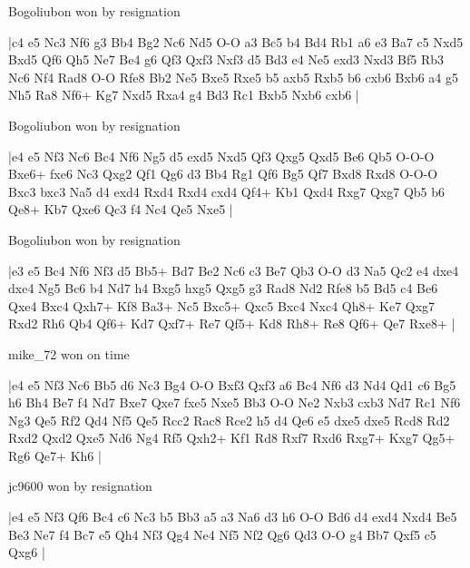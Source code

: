 \showboard

Bogoliubon won by resignation

\makegametitle
|c4 e5 Nc3 Nf6 g3 Bb4 Bg2 Nc6 Nd5 O-O a3 Bc5 b4 Bd4 Rb1 a6 e3 Ba7 c5 Nxd5 Bxd5 Qf6 Qh5 Ne7 Be4 g6 Qf3 Qxf3 Nxf3 d5 Bd3 e4 Ne5 exd3 Nxd3 Bf5 Rb3 Nc6 Nf4 Rad8 O-O Rfe8 Bb2 Ne5 Bxe5 Rxe5 b5 axb5 Rxb5 b6 cxb6 Bxb6 a4 g5 Nh5 Ra8 Nf6+ Kg7 Nxd5 Rxa4 g4 Bd3 Rc1 Bxb5 Nxb6 cxb6  |

\showboard

Bogoliubon won by resignation

\makegametitle
|e4 e5 Nf3 Nc6 Bc4 Nf6 Ng5 d5 exd5 Nxd5 Qf3 Qxg5 Qxd5 Be6 Qb5 O-O-O Bxe6+ fxe6 Nc3 Qxg2 Qf1 Qg6 d3 Bb4 Rg1 Qf6 Bg5 Qf7 Bxd8 Rxd8 O-O-O Bxc3 bxc3 Na5 d4 exd4 Rxd4 Rxd4 cxd4 Qf4+ Kb1 Qxd4 Rxg7 Qxg7 Qb5 b6 Qe8+ Kb7 Qxe6 Qc3 f4 Nc4 Qe5 Nxe5  |

\showboard

Bogoliubon won by resignation

\makegametitle
|e3 e5 Bc4 Nf6 Nf3 d5 Bb5+ Bd7 Be2 Nc6 c3 Be7 Qb3 O-O d3 Na5 Qc2 e4 dxe4 dxe4 Ng5 Bc6 b4 Nd7 h4 Bxg5 hxg5 Qxg5 g3 Rad8 Nd2 Rfe8 b5 Bd5 c4 Be6 Qxe4 Bxc4 Qxh7+ Kf8 Ba3+ Nc5 Bxc5+ Qxc5 Bxc4 Nxc4 Qh8+ Ke7 Qxg7 Rxd2 Rh6 Qb4 Qf6+ Kd7 Qxf7+ Re7 Qf5+ Kd8 Rh8+ Re8 Qf6+ Qe7 Rxe8+  |

\showboard

mike\_72 won on time

\makegametitle
|e4 e5 Nf3 Nc6 Bb5 d6 Nc3 Bg4 O-O Bxf3 Qxf3 a6 Bc4 Nf6 d3 Nd4 Qd1 c6 Bg5 h6 Bh4 Be7 f4 Nd7 Bxe7 Qxe7 fxe5 Nxe5 Bb3 O-O Ne2 Nxb3 cxb3 Nd7 Rc1 Nf6 Ng3 Qe5 Rf2 Qd4 Nf5 Qe5 Rcc2 Rac8 Rce2 h5 d4 Qe6 e5 dxe5 dxe5 Rcd8 Rd2 Rxd2 Qxd2 Qxe5 Nd6 Ng4 Rf5 Qxh2+ Kf1 Rd8 Rxf7 Rxd6 Rxg7+ Kxg7 Qg5+ Rg6 Qe7+ Kh6  |

\showboard

jc9600 won by resignation

\makegametitle
|e4 e5 Nf3 Qf6 Bc4 c6 Nc3 b5 Bb3 a5 a3 Na6 d3 h6 O-O Bd6 d4 exd4 Nxd4 Be5 Be3 Ne7 f4 Bc7 e5 Qh4 Nf3 Qg4 Ne4 Nf5 Nf2 Qg6 Qd3 O-O g4 Bb7 Qxf5 c5 Qxg6  |

\showboard

